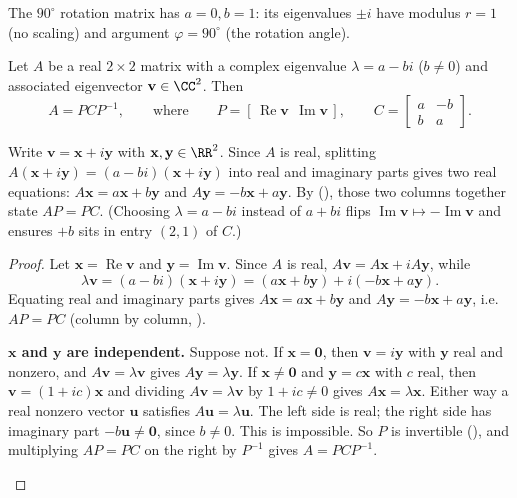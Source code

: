 \documentclass[10pt]{scrartcl}
\newcommand{\vv}[1]{\mathbf{#1}}
\begin{document}
\revisit The $90^\circ$ rotation matrix has $a=0,b=1$: its eigenvalues $\pm i$ have modulus $r=1$ (no scaling) and argument $\varphi=90^\circ$ (the rotation angle).

\begin{theorem*}
  Let $A$ be a real $2\times2$ matrix with a complex eigenvalue $\lambda=a-bi$ ($b\ne0$) and associated eigenvector $\vv v\in\CC^2$. Then
  \[
    A = P C P^{-1}, \qquad\text{where}\qquad P = [\,\operatorname{Re}\vv v\ \ \operatorname{Im}\vv v\,],\qquad C = \begin{bmatrix}a&-b\\b&a\end{bmatrix}.
  \]
\end{theorem*}
\begin{ideabox}
  Write $\vv v=\vv x+i\vv y$ with $\vv x,\vv y\in\RR^2$. Since $A$ is real, splitting $A(\vv x+i\vv y)=(a-bi)(\vv x+i\vv y)$ into real and imaginary parts gives two real equations: $A\vv x = a\vv x + b\vv y$ and $A\vv y = -b\vv x + a\vv y$. By (), those two columns together state $AP = PC$. (Choosing $\lambda=a-bi$ instead of $a+bi$ flips $\operatorname{Im}\vv v \mapsto -\operatorname{Im}\vv v$ and ensures $+b$ sits in entry $(2,1)$ of $C$.)
\end{ideabox}
\begin{proof}
  Let $\vv x=\operatorname{Re}\vv v$ and $\vv y=\operatorname{Im}\vv v$. Since $A$ is real, $A\vv v=A\vv x+iA\vv y$, while
  \[
    \lambda\vv v=(a-bi)(\vv x+i\vv y)=(a\vv x+b\vv y)+i(-b\vv x+a\vv y).
  \] Equating real and imaginary parts gives $A\vv x=a\vv x+b\vv y$ and $A\vv y=-b\vv x+a\vv y$, i.e.\ $AP=PC$ (column by column, ).
  \begin{steps}
    \ii \textbf{$\vv x$ and $\vv y$ are independent.} Suppose not. If $\vv x=\vv 0$, then $\vv v=i\vv y$ with $\vv y$ real and nonzero, and $A\vv v=\lambda\vv v$ gives $A\vv y=\lambda\vv y$. If $\vv x\ne\vv 0$ and $\vv y=c\vv x$ with $c$ real, then $\vv v=(1+ic)\vv x$ and dividing $A\vv v=\lambda\vv v$ by $1+ic\ne0$ gives $A\vv x=\lambda\vv x$. Either way a real nonzero vector $\vv u$ satisfies $A\vv u=\lambda\vv u$. The left side is real; the right side has imaginary part $-b\vv u\ne\vv 0$, since $b\ne0$. This is impossible.
    \ii So $P$ is invertible (), and multiplying $AP=PC$ on the right by $P^{-1}$ gives $A=PCP^{-1}$.
  \end{steps}
\end{proof}
\end{document}
